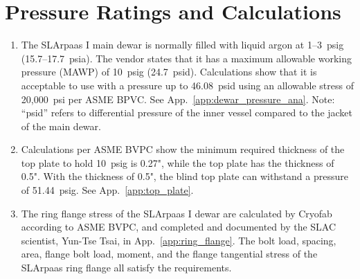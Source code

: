 \section{Pressure Ratings and Calculations}
\label{sec:pressure_cal}

\begin{enumerate}
    \item The SLArpaas I main dewar is normally filled with liquid argon at 
    1--3~psig (15.7--17.7~psia).
    The vendor states that it has a maximum allowable working pressure (MAWP) 
    of 10~psig (24.7~psid). 
    Calculations show that it is acceptable to use with a pressure up to
    46.08~psid using an allowable stress of 20,000~psi per ASME BPVC. 
    See App.~\ref{app:dewar_pressure_ana}. 
    Note: ``psid'' refers to differential pressure of the inner vessel compared 
    to the jacket of the main dewar.
    \item Calculations per ASME BVPC show the minimum required thickness of the top
    plate to hold 10~psig is 0.27", while the top plate has the thickness of 0.5".
    With the thickness of 0.5", the blind top plate can withstand a pressure of 51.44~psig.
    See App.~\ref{app:top_plate}.
    \item The ring flange stress of the SLArpaas I dewar are calculated by Cryofab
    according to ASME BVPC, and completed and documented by the SLAC scientist, Yun-Tse Tsai,
    in App.~\ref{app:ring_flange}.  The bolt load, spacing, area, flange bolt load, moment,
    and the flange tangential stress of the SLArpaas ring flange all satisfy the requirements.
\end{enumerate}    